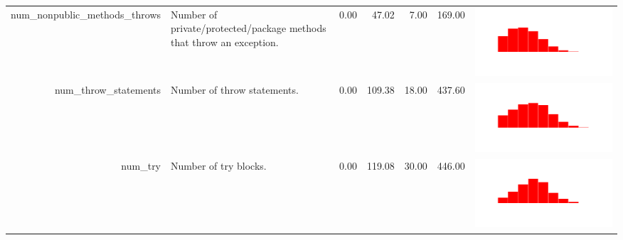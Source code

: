 \begin{table}[ht]
\begin{tabular}{rp{16em}rrrrc}
  num\_nonpublic\_methods\_throws & Number of private/protected/package methods that throw an exception. & 0.00 & 47.02 & 7.00 & 169.00 & \includegraphics[scale = 0.1, clip = true, trim= 50px 60px 50px 60px]{hist-3ed6823532ea8acc01d29f33cf9379a8.pdf} \\ 
  num\_throw\_statements & Number of throw statements. & 0.00 & 109.38 & 18.00 & 437.60 & \includegraphics[scale = 0.1, clip = true, trim= 50px 60px 50px 60px]{hist-b25888a559b579f477c029e39bd403d8.pdf} \\ 
  num\_try & Number of try blocks. & 0.00 & 119.08 & 30.00 & 446.00 & \includegraphics[scale = 0.1, clip = true, trim= 50px 60px 50px 60px]{hist-37304fd9b59fe8289145f1008ad89ad9.pdf} \\ 

\end{tabular}
\end{table}
